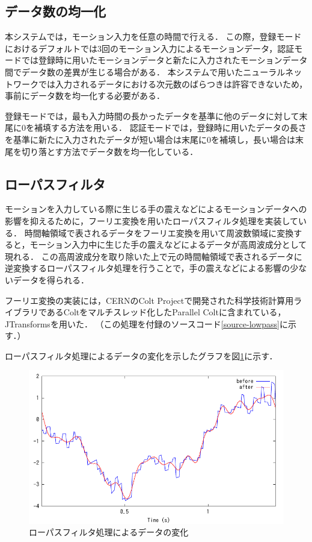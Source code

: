 \subsection{データ数の均一化}
本システムでは，モーション入力を任意の時間で行える．
この際，登録モードにおけるデフォルトでは3回のモーション入力によるモーションデータ，認証モードでは登録時に用いたモーションデータと新たに入力されたモーションデータ間でデータ数の差異が生じる場合がある．
本システムで用いたニューラルネットワークでは入力されるデータにおける次元数のばらつきは許容できないため，事前にデータ数を均一化する必要がある．

登録モードでは，最も入力時間の長かったデータを基準に他のデータに対して末尾に0を補填する方法を用いる．
認証モードでは，登録時に用いたデータの長さを基準に新たに入力されたデータが短い場合は末尾に0を補填し，長い場合は末尾を切り落とす方法でデータ数を均一化している．

\subsection{ローパスフィルタ}
モーションを入力している際に生じる手の震えなどによるモーションデータへの影響を抑えるために，フーリエ変換を用いたローパスフィルタ処理を実装している．
時間軸領域で表されるデータをフーリエ変換を用いて周波数領域に変換すると，モーション入力中に生じた手の震えなどによるデータが高周波成分として現れる．
この高周波成分を取り除いた上で元の時間軸領域で表されるデータに逆変換するローパスフィルタ処理を行うことで，手の震えなどによる影響の少ないデータを得られる．

フーリエ変換の実装には，CERNのColt Project\cite{4-colt-project}で開発された科学技術計算用ライブラリであるColtをマルチスレッド化したParallel Colt\cite{4-parallel-colt}に含まれている，JTransforms\cite{4-jtransforms}を用いた．
（この処理を付録のソースコード\ref{source-lowpass}に示す．）

ローパスフィルタ処理によるデータの変化を示したグラフを図\ref{graph-lowpass}に示す．

\begin{figure}[bthp]
  \centering
  \includegraphics[bb=0 0 360 216, width=12cm]{Graphs/lowpass.pdf}
  \caption{ローパスフィルタ処理によるデータの変化}
  \label{graph-lowpass}
\end{figure}


